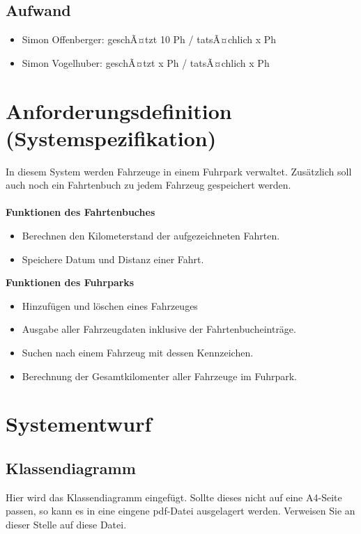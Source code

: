 \documentclass[12pt,naustrian,a4widepaper]{scrartcl}
\begin{document}
\subsection{Aufwand}
	
	\begin{itemize}
		\item Simon Offenberger: geschÃ¤tzt 10 Ph / tatsÃ¤chlich x Ph
		\item Simon Vogelhuber:  geschÃ¤tzt x Ph / tatsÃ¤chlich x Ph
	\end{itemize}

\clearpage
\section{Anforderungsdefinition (Systemspezifikation)}
In diesem System werden Fahrzeuge in einem Fuhrpark verwaltet. 
Zusätzlich soll auch noch ein Fahrtenbuch zu jedem Fahrzeug gespeichert werden.
\\
\\
\textbf{Funktionen des Fahrtenbuches}
\begin{itemize}
	\item Berechnen den Kilometerstand der aufgezeichneten Fahrten.
	\item Speichere Datum und Distanz einer Fahrt.
\end{itemize}

\textbf{Funktionen des Fuhrparks}
\begin{itemize}
	\item Hinzufügen und löschen eines Fahrzeuges
	\item Ausgabe aller Fahrzeugdaten inklusive der Fahrtenbucheinträge.
	\item Suchen nach einem Fahrzeug mit dessen Kennzeichen.
	\item Berechnung der Gesamtkilomenter aller Fahrzeuge im Fuhrpark.
\end{itemize}

\clearpage
\section{Systementwurf}

\subsection{Klassendiagramm}
\color{blue}
Hier wird das Klassendiagramm eingefügt. Sollte dieses nicht auf eine A4-Seite passen, so kann es in eine eingene pdf-Datei ausgelagert werden.
Verweisen Sie an dieser Stelle auf diese Datei.
\color{black}
\end{document}
